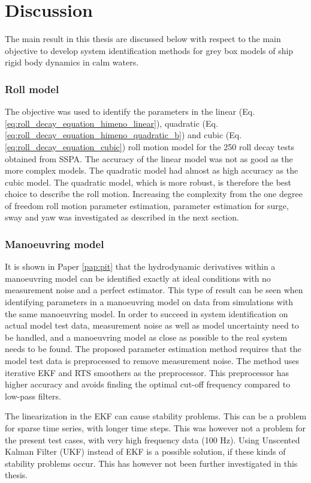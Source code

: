 \section{Discussion}
The main result in this thesis are discussed below with respect to the main objective to develop system identification methods for grey box models of ship rigid body dynamics in calm waters.

\subsubsection*{Roll model}
The objective was used to identify the parameters in the linear (Eq.\ref{eq:roll_decay_equation_himeno_linear}), quadratic (Eq.\ref{eq:roll_decay_equation_himeno_quadratic_b}) and cubic (Eq.\ref{eq:roll_decay_equation_cubic}) roll motion model for the 250 roll decay tests obtained from SSPA. 
The accuracy of the linear model was not as good as the more complex models. The quadratic model had almost as high accuracy as the cubic model. The quadratic model, which is more robust, is therefore the best choice to describe the roll motion. Increasing the complexity from the one degree of freedom roll motion parameter estimation, parameter estimation for surge, sway and yaw was investigated as described in the next section.

\subsubsection*{Manoeuvring model}
It is shown in Paper \ref{pap:pit} that the hydrodynamic derivatives within a manoeuvring model can be identified exactly at ideal conditions with no measurement noise and a perfect estimator. 
This type of result can be seen when identifying parameters in a manoeuvring model on data from simulations with the same manoeuvring model.
In order to succeed in system identification on actual model test data, measurement noise as well as model uncertainty need to be handled, and a manoeuvring model as close as possible to the real system needs to be found. The proposed parameter estimation method requires that the model test data is preprocessed to remove measurement noise. The method uses iterative EKF and RTS smoothers as the preprocessor. This preprocessor has higher accuracy and avoids finding the optimal cut-off frequency compared to low-pass filters. 

The linearization in the EKF can cause stability problems. This can be a problem for sparse time series, with longer time steps. This was however not a problem for the present test cases, with very high frequency data (100 Hz). 
Using Unscented Kalman Filter (UKF) instead of EKF is a possible solution, if these kinds of stability problems occur. This has however not been further investigated in this thesis.


